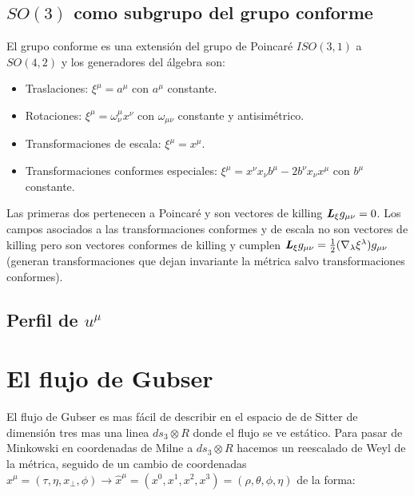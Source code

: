 \documentclass[11pt,a4paper]{article}
\begin{document}
\subsection{$SO(3)$ como subgrupo del grupo conforme}

El grupo conforme es una extensión del grupo de Poincaré $ISO(3,1)$ a $SO(4,2)$ y los generadores del álgebra son:

\begin{itemize}
\item  Traslaciones: $\xi^{\mu}=a^{\mu}$ con $a^{\mu}$ constante.
\end{itemize}

\begin{itemize}
\item  Rotaciones: $\xi^{\mu}=\omega^{\mu}_{\nu}x^{\nu}$ con $\omega_{{\mu}{\nu}}$ constante y antisimétrico.
\end{itemize}

\begin{itemize}
\item  Transformaciones de escala: $\xi^{\mu}=x^{\mu}$.
\end{itemize}

\begin{itemize}
\item  Transformaciones conformes especiales: $\xi^{\mu}=x^{\nu}x_{\nu}b^{\mu}-2b^{\nu}x_{\nu}x^{\mu}$ con $b^{\mu}$ constante.
\end{itemize}


Las primeras dos pertenecen a Poincaré y son vectores de killing $\textbf{\textit{L}}_{\xi}g_{{\mu}{\nu}}=0$. Los campos asociados a las transformaciones conformes y de escala no son vectores de killing pero son vectores conformes de killing y cumplen $\textbf{\textit{L}}_{\xi}g_{{\mu}{\nu}}=\frac{1}{2}(\nabla_{\lambda}\xi^{\lambda})g_{{\mu}{\nu}}$ (generan transformaciones que dejan invariante la métrica salvo transformaciones conformes).

\subsection{Perfil de $u^{\mu}$}


\section{El flujo de Gubser}

El flujo de Gubser es mas fácil de describir en el espacio de de Sitter de dimensión tres mas una linea $ds_{3}{\otimes}R$ donde el flujo se ve estático. Para pasar de Minkowski en coordenadas de Milne a $ds_{3}{\otimes}R$ hacemos un reescalado de Weyl de la métrica, seguido de un cambio de coordenadas $x^{\mu}=(\tau,\eta,x_{\bot},\phi)\rightarrow{\hat{x}^{\mu}}=(x^{0},x^{1},x^{2},x^{3})=(\rho,\theta,\phi,\eta)$ de la forma:
\end{document}
